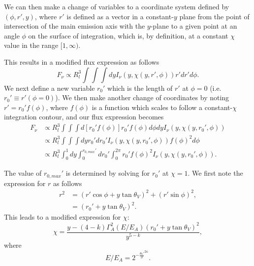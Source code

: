 \documentclass[11pt,twoside,letterpaper]{report}
\begin{document}
We can then make a change of variables to a coordinate system defined by $(\phi, r', y)$, where $r'$ is defined as a vector in a constant-$y$ plane from the point of intersection of the main emission axis with the $y$-plane to a given point at an angle $\phi$ on the surface of integration, which is, by definition, at a constant $\chi$ value in the range $[1, \infty)$.

This results in a modified flux expression as follows
\begin{equation}
F_{\nu} \propto R_l^3 \int\int\int dyI_{\nu}(y, \chi(y, r', \phi)) r'dr' d\phi.
\end{equation}
We next define a new variable $r_0'$ which is the length of $r'$ at $\phi = 0$ (i.e. $r_0' \equiv r'(\phi = 0)$). We then make another change of coordinates by noting $r' = r_0' f(\phi)$, where $f(\phi)$ is a function which scales to follow a constant-$\chi$ integration contour, and our flux expression becomes
\begin{align}
F_{\nu} &\propto R_l^3 \int\int\int d[r_0'f(\phi)] r_0'f(\phi) d\phi dy I_{\nu}(y, \chi(y, r_0', \phi)) \\
&\propto R_l^3 \int \int\int dy  r_0'd r_0' I_{\nu}(y, \chi(y, r_0', \phi))f(\phi)^2d\phi \\
&\propto R_l^3 \int_0^1dy \int_0^{r_{0, max}'} dr_0' \int_0^{2\pi} r_0' f(\phi)^2 I_{\nu}(y, \chi(y, r_0', \phi)) .
\end{align}

The value of $r_{0, max}'$ is determined by solving for $r_0'$ at $\chi = 1$. We first note the expression for $r$ as follows
\begin{align}
r^2 &= (r' \cos \phi + y\tan \theta _V)^2 + (r' \sin \phi )^2, \\
&= (r_0' + y \tan \theta _V)^2.
\end{align}
This leads to a modified expression for $\chi$:
\begin{equation}
\chi = \frac{y - (4-k)\Gamma_A^2(E/E_A)(r_0' + y \tan \theta _V)^2}{y^{5-k}},
\end{equation}
where 
\begin{equation}
E/E_A = 2^{-\frac{\theta_0'}{\sigma}^{2\kappa}}.
\end{equation}
\end{document}
